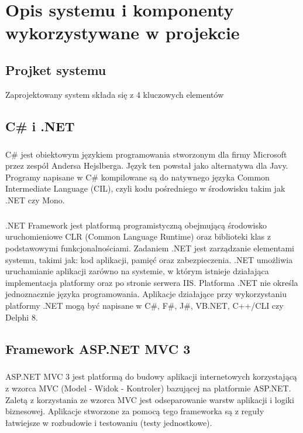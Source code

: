 \chapter{Opis systemu i komponenty wykorzystywane w projekcie}
\label{cha:projektsys}

\section{Projket systemu} %
\label{sec:projket_systemu}
Zaprojektowany system składa się z 4 kluczowych elementów


\section{ C\# i .NET }
\paragraph{}
C\# jest obiektowym językiem programowania stworzonym dla firmy Microsoft przez zespół Andersa Hejslberga. Język ten powstał jako alternatywa dla Javy. Programy napisane w C\# kompilowane są do natywnego języka Common Intermediate Language (CIL), czyli kodu pośredniego w środowisku takim jak .NET czy Mono.
\paragraph{}
.NET Framework jest platformą programistyczną obejmującą środowisko uruchomieniowe CLR (Common Language Runtime) oraz biblioteki klas z podstawowymi funkcjonalnościami. Zadaniem .NET jest zarządzanie elementami systemu, takimi jak: kod aplikacji, pamięć oraz zabezpieczenia. .NET umożliwia uruchamianie aplikacji zarówno na systemie, w którym istnieje działająca implementacja platformy oraz po stronie serwera IIS. Platforma .NET nie określa jednoznacznie języka programowania. Aplikacje działające przy wykorzystaniu platformy .NET mogą być napisane w C\#, F\#, J\#, VB.NET, C++/CLI czy Delphi 8. 

\section{Framework ASP.NET MVC 3}

\paragraph{}
ASP.NET MVC 3 jest platformą do budowy aplikacji internetowych korzystającą z wzorca MVC (Model - Widok - Kontroler) bazującej na platformie ASP.NET. Zaletą z korzystania ze wzorca MVC jest odseparowanie warstw aplikacji i logiki biznesowej. Aplikacje stworzone za pomocą tego frameworka są z reguły łatwiejsze w rozbudowie i testowaniu (testy jednostkowe).


